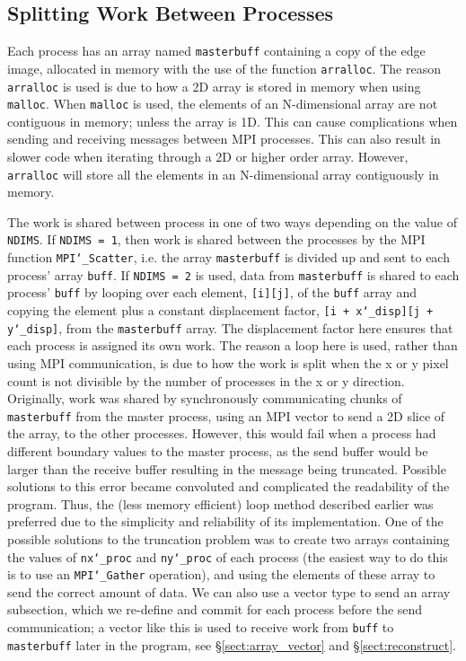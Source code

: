\documentclass[11pt, a4paper]{article}
\begin{document}
		\subsection{Splitting Work Between Processes} \label{sect:deconstruct}
			Each process has an array named \texttt{masterbuff} containing a copy of the edge image, allocated in memory with the use of the function \texttt{arralloc}. The reason \texttt{arralloc} is used is due to how a 2D array is stored in memory when using \texttt{malloc}. When \texttt{malloc} is used, the elements of an N-dimensional array are not contiguous in memory; unless the array is 1D. This can cause complications when sending and receiving messages between MPI processes. This can also result in slower code when iterating through a 2D or higher order array. However, \texttt{arralloc} will store all the elements in an N-dimensional array contiguously in memory.
			
			The work is shared between process in one of two ways depending on the value of \texttt{NDIMS}. If \texttt{NDIMS = 1}, then work is shared between the processes by the MPI function \texttt{MPI\char`_Scatter}, i.e. the array \texttt{masterbuff} is divided up and sent to each process' array \texttt{buff}. If \texttt{NDIMS = 2} is used, data from \texttt{masterbuff} is shared to each process' \texttt{buff} by looping over each element, \texttt{[i][j]}, of the \texttt{buff} array and copying the element plus a constant displacement factor, \texttt{[i + x\char`_disp][j + y\char`_disp]}, from the \texttt{masterbuff} array. The displacement factor here ensures that each process is assigned its own work. The reason a loop here is used, rather than using MPI communication, is due to how the work is split when the x or y pixel count is not divisible by the number of processes in the x or y direction. Originally, work was shared by synchronously communicating chunks of \texttt{masterbuff} from the master process, using an MPI vector to send a 2D slice of the array, to the other processes. However, this would fail when a process had different boundary values to the master process, as the send buffer would be larger than the receive buffer resulting in the message being truncated. Possible solutions to this error became convoluted and complicated the readability of the program. Thus, the (less memory efficient) loop method described earlier was preferred due to the simplicity and reliability of its implementation.	One of the possible solutions to the truncation problem was to create two arrays containing the values of \texttt{nx\char`_proc} and \texttt{ny\char`_proc} of each process (the easiest way to do this is to use an \texttt{MPI\char`_Gather} operation), and using the elements of these array to send the correct amount of data. We can also use a vector type to send an array subsection, which we re-define and commit for each process before the send communication; a vector like this is used to receive work from \texttt{buff} to \texttt{masterbuff} later in the program, see \S\ref{sect:array_vector} and \S\ref{sect:reconstruct}.
			
\end{document}
